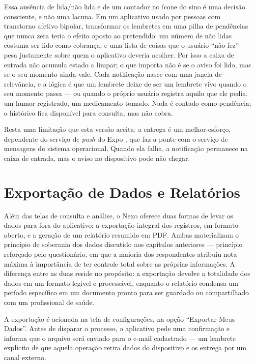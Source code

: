 Essa ausência de lida/não lida e de um contador no ícone do sino é uma
decisão consciente, e não uma lacuna. Em um aplicativo usado por pessoas
com transtorno afetivo bipolar, transformar os lembretes em uma pilha de
pendências que nunca zera teria o efeito oposto ao pretendido: um número de
não lidas costuma ser lido como cobrança, e uma lista de coisas que o
usuário ``não fez'' pesa justamente sobre quem o aplicativo deveria acolher.
Por isso a caixa de entrada não acumula estado a limpar; o que importa não é
se o aviso foi lido, mas se o seu momento ainda vale. Cada notificação nasce
com uma janela de relevância, e a lógica é que um lembrete deixe de ser um
lembrete vivo quando o seu momento passa --- ou quando o próprio usuário
registra aquilo que ele pedia: um humor registrado, um medicamento tomado.
Nada é contado como pendência; o histórico fica disponível para consulta,
mas não cobra.

Resta uma limitação que esta versão aceita: a entrega é um melhor-esforço,
dependente do serviço de \textit{push} do Expo \cite{expo:2026}, que faz a
ponte com o serviço de mensagens do sistema operacional. Quando ela falha,
a notificação permanece na caixa de entrada, mas o aviso no dispositivo
pode não chegar.

\section{Exportação de Dados e Relatórios}\label{sec:export-report}

Além das telas de consulta e análise, o Nexo oferece duas formas de
levar os dados para fora do aplicativo: a exportação integral dos
registros, em formato aberto, e a geração de um relatório resumido em
PDF. Ambas materializam o princípio de soberania dos dados discutido nos
capítulos anteriores --- princípio reforçado pelo questionário, em que a
maioria dos respondentes atribuiu nota máxima à importância de ter
controle total sobre as próprias informações. A diferença entre as duas
reside no propósito: a exportação devolve a totalidade dos dados em um
formato legível e processável, enquanto o relatório condensa um período
específico em um documento pronto para ser guardado ou compartilhado com
um profissional de saúde.

A exportação é acionada na tela de configurações, na opção ``Exportar
Meus Dados''. Antes de disparar o processo, o aplicativo pede uma
confirmação e informa que o arquivo será enviado para o e-mail cadastrado
--- um lembrete explícito de que aquela operação retira dados do
dispositivo e os entrega por um canal externo.

